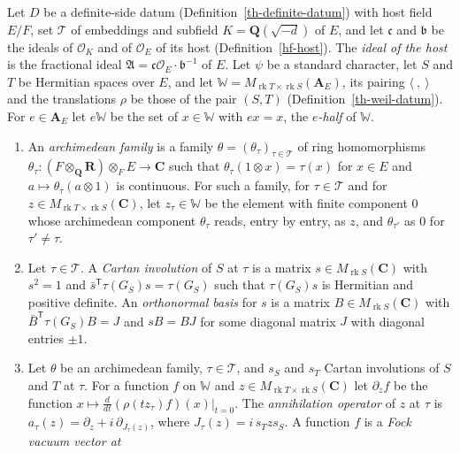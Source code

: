 \begin{definition}\label{th-grid-fock}
Let $D$ be a definite-side datum (Definition~\ref{th-definite-datum}) with host
field $E/F$, set $\mathcal T$ of embeddings and subfield
$K=\mathbf Q(\sqrt{-d})$ of $E$, and let $\mathfrak c$ and $\mathfrak b$ be the
ideals of $\mathcal O_K$ and of $\mathcal O_E$ of its host
(Definition~\ref{hf-host}). The \emph{ideal of the host} is the fractional
ideal $\mathfrak A=\mathfrak c\mathcal O_E\cdot\mathfrak b^{-1}$ of $E$. Let
$\psi$ be a standard character, let $S$ and $T$ be Hermitian spaces over $E$,
and let $\mathbb W=M_{\operatorname{rk}T\times\operatorname{rk}S}(\mathbf A_E)$,
its pairing $\langle\ ,\ \rangle$ and the translations $\rho$ be those of the
pair $(S,T)$ (Definition~\ref{th-weil-datum}). For $e\in\mathbf A_E$ let
$e\mathbb W$ be the set of $x\in\mathbb W$ with $ex=x$, the \emph{$e$-half} of
$\mathbb W$.
\begin{enumerate}
\item An \emph{archimedean family} is a family
  $\theta=(\theta_\tau)_{\tau\in\mathcal T}$ of ring homomorphisms
  $\theta_\tau\colon(F\otimes_{\mathbf Q}\mathbf R)\otimes_FE\to\mathbf C$ such
  that $\theta_\tau(1\otimes x)=\tau(x)$ for $x\in E$ and
  $a\mapsto\theta_\tau(a\otimes1)$ is continuous. For such a family, for
  $\tau\in\mathcal T$ and for $z\in M_{\operatorname{rk}T\times\operatorname{rk}S}(\mathbf C)$,
  let $z_\tau\in\mathbb W$ be the element with finite component $0$ whose
  archimedean component $\theta_\tau$ reads, entry by entry, as $z$, and
  $\theta_{\tau'}$ as $0$ for $\tau'\neq\tau$.
\item Let $\tau\in\mathcal T$. A \emph{Cartan involution} of $S$ at $\tau$ is a
  matrix $s\in M_{\operatorname{rk}S}(\mathbf C)$ with $s^2=1$ and
  $\bar s^{\mathsf T}\tau(G_S)s=\tau(G_S)$ such that $\tau(G_S)s$ is Hermitian
  and positive definite. An \emph{orthonormal basis} for $s$ is a matrix
  $B\in M_{\operatorname{rk}S}(\mathbf C)$ with $\bar B^{\mathsf T}\tau(G_S)B=J$
  and $sB=BJ$ for some diagonal matrix $J$ with diagonal entries $\pm1$.
\item Let $\theta$ be an archimedean family, $\tau\in\mathcal T$, and $s_S$ and
  $s_T$ Cartan involutions of $S$ and $T$ at $\tau$. For a function $f$ on
  $\mathbb W$ and $z\in M_{\operatorname{rk}T\times\operatorname{rk}S}(\mathbf C)$
  let $\partial_zf$ be the function
  $x\mapsto\frac{d}{dt}(\rho(tz_\tau)f)(x)|_{t=0}$. The \emph{annihilation
  operator} of $z$ at $\tau$ is $a_\tau(z)=\partial_z+i\,\partial_{J_\tau(z)}$,
  where $J_\tau(z)=i\,s_Tzs_S$. A function $f$ is a \emph{Fock vacuum vector at
}
\end{enumerate}
\end{definition}

